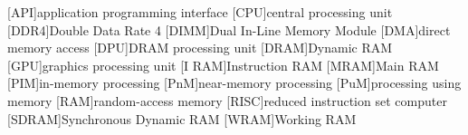 \label{apx:acronyms}

\begin{acronym}[SDRAM]
	[API]{application programming interface}
	[CPU]{central processing unit}
	[DDR4]{Double Data Rate 4}
	[DIMM]{Dual In-Line Memory Module}
	[DMA]{direct memory access}
	[DPU]{\acs*{DRAM} processing unit}
	[DRAM]{Dynamic \acs*{RAM}}
	[GPU]{graphics processing unit}
	[I\kern1pt RAM]{Instruction \acs*{RAM}}
	[MRAM]{Main \acs*{RAM}}
	[PIM]{in-memory processing}
	[PnM]{near-memory processing}
	[PuM]{processing using memory}
	[RAM]{random-access memory}
	[RISC]{reduced instruction set computer}
	[SDRAM]{Synchronous Dynamic \acs*{RAM}}
	[WRAM]{Working \acs*{RAM}}
\end{acronym}
